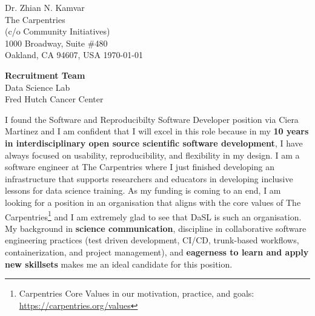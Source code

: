 


\clearpage
\begin{flushright}
  Dr. Zhian N. Kamvar\\
  The Carpentries\\
  (c/o Community Initiatives)\\
  1000 Broadway, Suite \#480\\
  Oakland, CA 94607, USA
  \today
\end{flushright}

\textbf{Recruitment Team} \\
Data Science Lab \\
Fred Hutch Cancer Center

\vspace{2ex}

I found the Software and Reproducibilty Software Developer position via Ciera
Martinez and I am confident that I will excel in this role because in my
\textbf{10 years in interdisciplinary open source scientific software
development}, I have always focused on usability, reproducibility, and
flexibility in my design. I am a software engineer at The Carpentries where I
just finished developing an infrastructure that supports researchers and
educators in developing inclusive lessons for data science training. As my
funding is coming to an end, I am looking for a position in an organisation
that aligns with the core values of The
Carpentries\footnote{Carpentries Core Values in our motivation, practice, and goals: \url{https://carpentries.org/values}} and I am extremely glad to
see that DaSL is such an organisation. My background in \textbf{science
communication}, discipline in collaborative software engineering practices
(test driven development, CI/CD, trunk-based workflows, containerization, and
project management), and \textbf{eagerness to learn and apply new skillsets}
makes me an ideal candidate for this position. 

\vspace{2ex}

